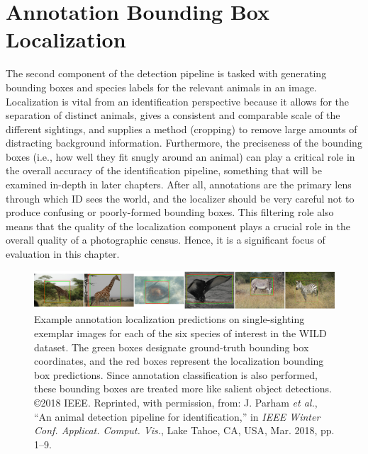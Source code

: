 \section{Annotation Bounding Box Localization}

The second component of the detection pipeline is tasked with generating bounding boxes and species labels for the relevant animals in an image.  Localization is vital from an identification perspective because it allows for the separation of distinct animals, gives a consistent and comparable scale of the different sightings, and supplies a method (cropping) to remove large amounts of distracting background information.  Furthermore, the preciseness of the bounding boxes (i.e., how well they fit snugly around an animal) can play a critical role in the overall accuracy of the identification pipeline, something that will be examined in-depth in later chapters.  After all, annotations are the primary lens through which ID sees the world, and the localizer should be very careful not to produce confusing or poorly-formed bounding boxes.  This filtering role also means that the quality of the localization component plays a crucial role in the overall quality of a photographic census. Hence, it is a significant focus of evaluation in this chapter.

\begin{figure}[!t]
    \begin{center}
        \includegraphics[width=1.0\linewidth]{resources/localizations.pdf}
    \end{center}
    \caption{Example annotation localization predictions on single-sighting exemplar images for each of the six species of interest in the WILD dataset.  The green boxes designate ground-truth bounding box coordinates, and the red boxes represent the localization bounding box predictions.  Since annotation classification is also performed, these bounding boxes are treated more like salient object detections.  \copyright 2018 IEEE. Reprinted, with permission, from: J. Parham \textit{et al.}, ``An animal detection pipeline for identification,'' in \textit{IEEE Winter Conf. Applicat. Comput. Vis.}, Lake Tahoe, CA, USA, Mar. 2018, pp. 1–9.}
    \label{fig:localizations}
\end{figure}

